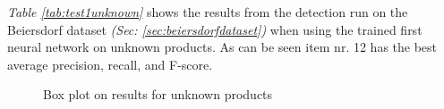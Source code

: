 \textit{Table \ref{tab:test1unknown}} shows the results from the detection run on the Beiersdorf dataset \textit{(Sec: \ref{sec:beiersdorfdataset})} when using the trained first neural network on unknown products. As can be seen item nr. 12 has the best average precision, recall, and F-score.

\clearpage

\begin{figure}[h]
 \centering
 \hfill
 
 \caption{Box plot on results for unknown products}
 \label{fig:unknowniou}
\end{figure}

